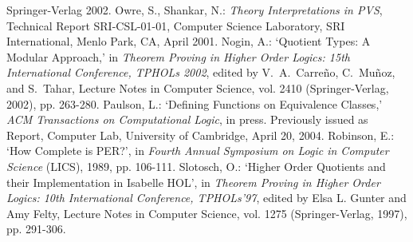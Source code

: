 \documentclass[envcountsame,runningheads]{llncs}
\begin{document}
\begin{thebibliography}{5}
Springer-Verlag 2002.
%
Owre, S., Shankar, N.:
{\it Theory Interpretations in PVS},
Technical Report SRI-CSL-01-01,
Computer Science Laboratory, SRI International,
Menlo Park, CA, April 2001.
%
Nogin, A.:
`Quotient Types: A Modular Approach,' in
{\it Theorem Proving in Higher Order Logics:
15th International Conference, TPHOLs 2002},
edited by V.~A.~Carre\~{n}o, C.~Mu\~{n}oz, and S.~Tahar,
Lecture Notes in Computer Science, vol. 2410
(Springer-Verlag, 2002), pp. 263-280.
%
Paulson, L.:
`Defining Functions on Equivalence Classes,'
{\it ACM Transactions on Computational Logic},
in press.  Previously issued as
Report, Computer Lab, University of Cambridge, April 20, 2004.
%
Robinson, E.:
`How Complete is PER?',
in {\it Fourth Annual Symposium on Logic in Computer Science\/} (LICS),
1989, pp. 106-111.
%
Slotosch, O.:
`Higher Order Quotients and their Implementation in Isabelle HOL', in
{\it Theorem Proving in Higher Order Logics:
10th International Conference, TPHOLs'97},
edited by Elsa L. Gunter and Amy Felty,
Lecture Notes in Computer Science, vol. 1275
(Springer-Verlag, 1997), pp. 291-306.
%
\end{thebibliography}




%
\end{document}
